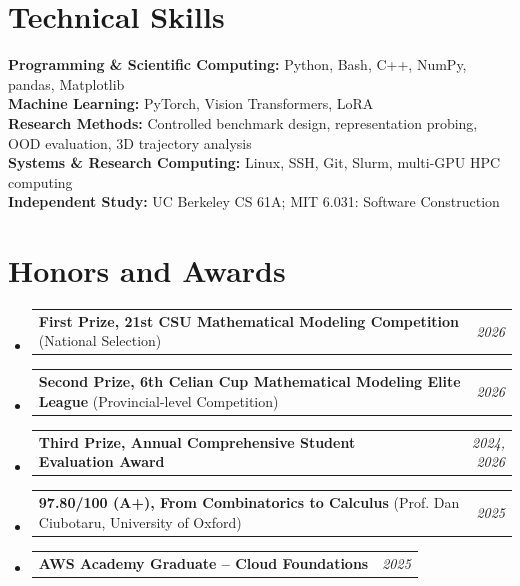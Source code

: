 \documentclass[a4paper,11pt]{article}
\makeatletter
\newcommand{\resumePOR}[3]{
\vspace{0.5mm}\item
    \begin{tabular*}{0.97\textwidth}[t]{l@{\extracolsep{\fill}}r}
        \textbf{#1}\hspace{0.3mm}#2 & \textit{\small{#3}}
    \end{tabular*}
    \vspace{-2mm}
}
\newcommand{\resumeSubHeadingListStart}{\begin{itemize}[leftmargin=*,labelsep=1mm]}
\newcommand{\resumeSubHeadingListEnd}{\end{itemize}\vspace{2mm}}
\makeatother
\begin{document}
\section{\textbf{Technical Skills}}
\vspace{1mm}
\small{
\textbf{Programming \& Scientific Computing:} Python, Bash, C++, NumPy, pandas, Matplotlib\\
\textbf{Machine Learning:} PyTorch, Vision Transformers, LoRA\\
\textbf{Research Methods:} Controlled benchmark design, representation probing, OOD evaluation, 3D trajectory analysis\\
\textbf{Systems \& Research Computing:} Linux, SSH, Git, Slurm, multi-GPU HPC computing\\
\textbf{Independent Study:} UC Berkeley CS 61A; MIT 6.031: Software Construction
}
\vspace{-4mm}

\section{\textbf{Honors and Awards}}
\resumeSubHeadingListStart
\resumePOR{\textnormal{First Prize, 21st CSU Mathematical Modeling Competition}}{ (National Selection)}{2026}
\resumePOR{\textnormal{Second Prize, 6th Celian Cup Mathematical Modeling Elite League}}{ (Provincial-level Competition)}{2026}
\resumePOR{\textnormal{Third Prize, Annual Comprehensive Student Evaluation Award}}{}{2024, 2026}
\resumePOR{\textnormal{97.80/100 (A+), From Combinatorics to Calculus}}{ (Prof. Dan Ciubotaru, University of Oxford)}{2025}
\resumePOR{\textnormal{AWS Academy Graduate -- Cloud Foundations}}{}{2025}
\resumeSubHeadingListEnd
\vspace{-4mm}
\end{document}
